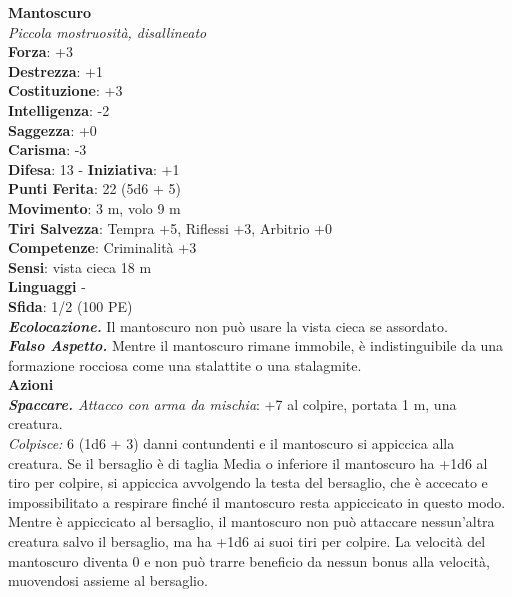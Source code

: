 \begin{multicols}{2}
\medskip\textbf{Mantoscuro}\\
\emph{Piccola mostruosità, disallineato}\\
\textbf{Forza}: +3\\
\textbf{Destrezza}: +1\\
\textbf{Costituzione}: +3\\
\textbf{Intelligenza}: -2\\
\textbf{Saggezza}: +0\\
\textbf{Carisma}: -3\\
\textbf{Difesa}: 13 - \textbf{Iniziativa}: +1\\
\textbf{Punti Ferita}: 22 (5d6 + 5)\\
\textbf{Movimento}: 3 m, volo 9 m\\
\textbf{Tiri Salvezza}: Tempra +5, Riflessi +3, Arbitrio +0\\
\textbf{Competenze}: Criminalità +3\\
\textbf{Sensi}: vista cieca 18 m\\
\textbf{Linguaggi} -\\
\textbf{Sfida}: 1/2 (100 PE)\smallskip\\
\emph{\textbf{Ecolocazione.}} Il mantoscuro non può usare la vista cieca se assordato.\\
\emph{\textbf{Falso Aspetto.}} Mentre il mantoscuro rimane immobile, è indistinguibile da una formazione rocciosa come una stalattite o una stalagmite.\\
\smallskip\textbf{Azioni}\\
\emph{\textbf{Spaccare.} Attacco con arma da mischia}: +7 al colpire, portata 1 m, una creatura.\\
\emph{Colpisce:} 6 (1d6 + 3) danni contundenti e il mantoscuro si appiccica alla creatura. Se il bersaglio è di taglia Media o inferiore il mantoscuro ha +1d6 al tiro per colpire, si appiccica avvolgendo la testa del bersaglio, che è accecato e impossibilitato a respirare finché il mantoscuro resta appiccicato in questo modo. \\
Mentre è appiccicato al bersaglio, il mantoscuro non può attaccare nessun'altra creatura salvo il bersaglio, ma ha +1d6 ai suoi tiri per colpire. La velocità del mantoscuro diventa 0 e non può trarre beneficio da nessun bonus alla velocità, muovendosi assieme al bersaglio.\\


\end{multicols}

